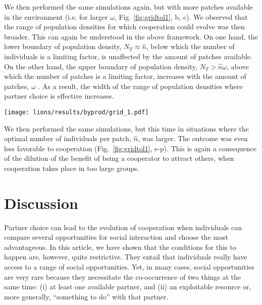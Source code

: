 We then performed the same simulations again, but with more patches available in the environment (i.e. for larger $\omega$, Fig. \ref{fig:gridtol1}, b, c). We observed that the range of population densities for which cooperation could evolve was then broader. This can again be understood in the above framework. On one hand, the lower boundary of population density, $N_T \approx \hat{n}$, below which the number of individuals is a limiting factor, is unaffected by the amount of patches available.  On the other hand, the upper boundary of population density, $N_T > \hat{n}\omega$, above which the number of patches is a limiting factor, increases with the amount of patches, $\omega$ . As a result, the width of the range of population densities where partner choice is effective increases.

\begin{figure*}
    \centering
    \texttt{[image: lions/results/byprod/grid\_1.pdf]}
    \caption{Effect on the population size in the environment with 20, 40 or 80 patches and an optimal number ofagents $\hat{n} = 2, 3$ and $\sigma = 1$. Agents have a cooperative behaviour for $\hat{n} < N_T < \omega\times \hat{n}$ and for $\hat{n} = 2$.}
    \label{fig:gridtol1}
\end{figure*}

We then performed the same simulations, but this time in situations where the optimal number of individuals per patch, $\hat{n}$, was larger. The outcome was even less favorable to cooperation (Fig.~\ref{fig:gridtol1}, e-p). This is again a consequence of the dilution of the benefit of being a cooperator to attract others, when cooperation takes place in too large groups.

\section{Discussion}

Partner choice can lead to the evolution of cooperation when individuals can compare several opportunities for social interaction and choose the most advantageous. In this article, we have shown that the conditions for this to happen are, however, quite restrictive. They entail  that individuals really have access to a range of social opportunities. Yet, in many cases, social opportunities are very rare because they necessitate the co-occurrence of two things at the same time: (i) at least one available partner, and (ii) an exploitable resource or, more generally, ``something to do'' with that partner. 

